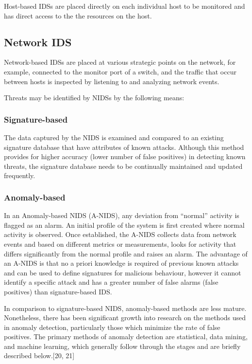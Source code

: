 \documentclass[11pt,]{article}
\begin{document}
Host-based IDSs are placed directly on each individual host to be
monitored and has direct access to the the resources on the host.

\subsection{Network IDS}\label{network-ids}

Network-based IDSs are placed at various strategic points on the
network, for example, connected to the monitor port of a switch, and the
traffic that occur between hosts is inspected by listening to and
analyzing network events.

Threats may be identified by NIDSs by the following means:

\subsubsection{Signature-based}\label{signature-based}

The data captured by the NIDS is examined and compared to an existing
signature database that have attributes of known attacks. Although this
method provides for higher accuracy (lower number of false positives) in
detecting known threats, the signature database needs to be continually
maintained and updated frequently.

\subsubsection{Anomaly-based}\label{anomaly-based}

In an Anomaly-based NIDS (A-NIDS), any deviation from ``normal''
activity is flagged as an alarm. An initial profile of the system is
first created where normal activity is observed. Once established, the
A-NIDS collects data from network events and based on different metrics
or measurements, looks for activity that differs significantly from the
normal profile and raises an alarm. The advantage of an A-NIDS is that
no a priori knowledge is required of previous known attacks and can be
used to define signatures for malicious behaviour, however it cannot
identify a specific attack and has a greater number of false alarms
(false positives) than signature-based IDS.

In comparison to signature-based NIDS, anomaly-based methods are less
mature. Nonetheless, there has been significant growth into research on
the methods used in anomaly detection, particularly those which minimize
the rate of false positives. The primary methods of anomaly detection
are statistical, data mining, and machine learning, which generally
follow through the stages and are briefly described below.{[}20, 21{]}
\end{document}
